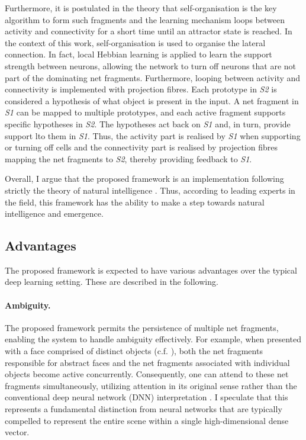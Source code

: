 Furthermore, it is postulated in the theory that self-organisation is the key algorithm to form such fragments and the learning mechanism loops between activity and connectivity for a short time until an attractor state is reached.
In the context of this work, self-organisation is used to organise the lateral connection. In fact, local Hebbian learning is applied to learn the support strength between neurons, allowing the network to turn off neurons that are not part of the dominating net fragments.
Furthermore, looping between activity and connectivity is implemented with projection fibres. 
Each prototype in \emph{S2} is considered a hypothesis of what object is present in the input. A net fragment in \emph{S1} can be mapped to multiple prototypes, and each active fragment supports specific hypotheses in \emph{S2}. The hypotheses act back on \emph{S1} and, in turn, provide support lto them in \emph{S1}. Thus, the activity part is realised by \emph{S1} when supporting or turning off cells and the connectivity part is realised by projection fibres mapping the net fragments to \emph{S2}, thereby providing feedback to \emph{S1}.

Overall, I argue that the proposed framework is an implementation following strictly the theory of natural intelligence \cite{von_der_malsburg_theory_2022}. Thus, according to leading experts in the field, this framework has the ability to make a step towards natural intelligence and emergence. 


\subsection{Advantages}
The proposed framework is expected to have various advantages over the typical deep learning setting. These are described in the following.

\paragraph{Ambiguity.} The proposed framework permits the persistence of multiple net fragments, enabling the system to handle ambiguity effectively. For example, when presented with a face comprised of distinct objects (c.f. ), both the net fragments responsible for abstract faces and the net fragments associated with individual objects become active concurrently. Consequently, one can attend to these net fragments simultaneously, utilizing attention in its original sense rather than the conventional deep neural network (DNN) interpretation . I speculate that this represents a fundamental distinction from neural networks that are typically compelled to represent the entire scene within a single high-dimensional dense vector.

